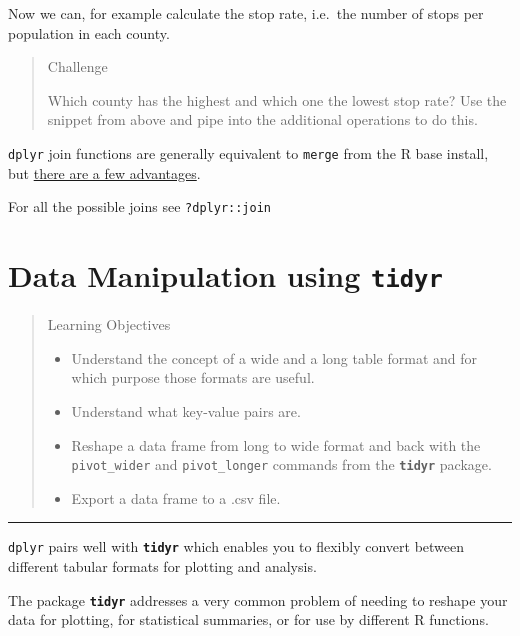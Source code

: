 \documentclass[
]{book}
\providecommand{\tightlist}{%
  \setlength{\itemsep}{0pt}\setlength{\parskip}{0pt}}
\begin{document}
Now we can, for example calculate the stop rate, i.e.~the number of stops per population in each county.

\begin{quote}
Challenge

Which county has the highest and which one the lowest stop rate?
Use the snippet from above and pipe into the additional operations
to do this.
\end{quote}

\texttt{dplyr} join functions are generally equivalent to \texttt{merge} from the R base install, but \href{https://groups.google.com/d/msg/manipulatr/OuAPC4VyfIc/Qnt8mDfq0WwJ}{there are a few advantages}.

For all the possible joins see \texttt{?dplyr::join}

\hypertarget{tidyr}{%
\chapter{\texorpdfstring{Data Manipulation using \textbf{\texttt{tidyr}}}{Data Manipulation using tidyr}}\label{tidyr}}

\begin{quote}
Learning Objectives

\begin{itemize}
\tightlist
\item
  Understand the concept of a wide and a long table format and for which purpose those formats are useful.
\item
  Understand what key-value pairs are.
\item
  Reshape a data frame from long to wide format and back with the \texttt{pivot\_wider} and \texttt{pivot\_longer} commands from the \textbf{\texttt{tidyr}} package.
\item
  Export a data frame to a .csv file.
\end{itemize}
\end{quote}

\begin{center}\rule{0.5\linewidth}{0.5pt}\end{center}

\texttt{dplyr} pairs well with \textbf{\texttt{tidyr}} which enables you to flexibly convert between different tabular formats for plotting and analysis.

The package \textbf{\texttt{tidyr}} addresses a very common problem of needing to reshape your data for plotting, for statistical summaries, or for use by different R functions.
\end{document}
